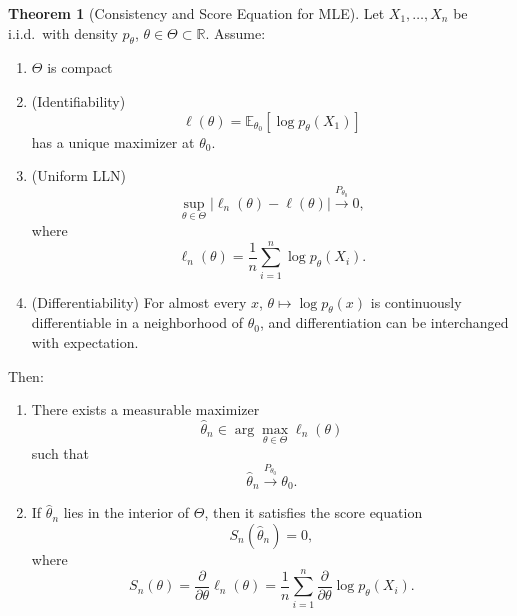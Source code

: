 \documentclass[11pt]{article}
\theoremstyle{definition}
\newtheorem{theo}{Theorem}[section]
\begin{document}
\begin{theo}[Consistency and Score Equation for MLE]
Let $X_1,\dots,X_n$ be i.i.d.\ with density $p_\theta$,
$\theta \in \Theta \subset \mathbb{R}$.
Assume:

\begin{enumerate}
\item[(1)] $\Theta$ is compact
\item[(2)] (Identifiability)
\[
\ell(\theta)
=
\mathbb{E}_{\theta_0}[\log p_\theta(X_1)]
\]
has a unique maximizer at $\theta_0$.
\item[(3)] (Uniform LLN)
\[
\sup_{\theta \in \Theta}
\left|
\ell_n(\theta) - \ell(\theta)
\right|
\xrightarrow{P_{\theta_0}} 0,
\]
where
\[
\ell_n(\theta)
=
\frac{1}{n}\sum_{i=1}^n \log p_\theta(X_i).
\]
\item[(4)] (Differentiability)
For almost every $x$, $\theta \mapsto \log p_\theta(x)$
is continuously differentiable in a neighborhood of $\theta_0$,
and differentiation can be interchanged with expectation.
\end{enumerate}

Then:

\begin{enumerate}
\item[(i)] There exists a measurable maximizer
\[
\hat{\theta}_n \in \arg\max_{\theta \in \Theta} \ell_n(\theta)
\]
such that
\[
\hat{\theta}_n \xrightarrow{P_{\theta_0}} \theta_0.
\]

\item[(ii)] If $\hat{\theta}_n$ lies in the interior of $\Theta$,
then it satisfies the score equation
\[
S_n(\hat{\theta}_n)=0,
\]
where
\[
S_n(\theta)
=
\frac{\partial}{\partial\theta} \ell_n(\theta)
=
\frac{1}{n}\sum_{i=1}^n
\frac{\partial}{\partial\theta}
\log p_\theta(X_i).
\]
\end{enumerate}
\end{theo}
\end{document}
